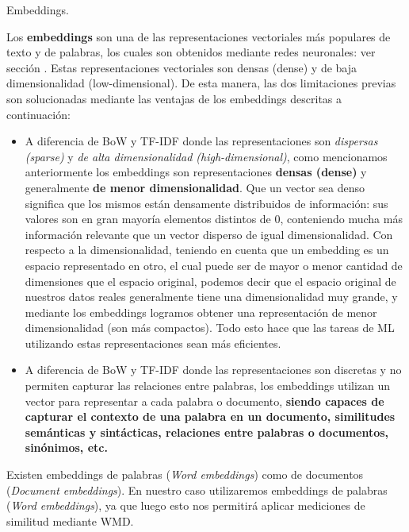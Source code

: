 \documentclass[12pt,a4paper]{article}
\makeatletter
\renewcommand\paragraph{\@startsection{paragraph}{4}{\z@}
            {-2.5ex\@plus -1ex \@minus -.25ex}
            {1.25ex \@plus .25ex}
            {\normalfont\normalsize\bfseries}}
\makeatother
\begin{document}
\begin{sloppypar}
\paragraph{Embeddings.}\label{embedd}

Los \textbf{embeddings} son una de las representaciones vectoriales más populares de texto y de palabras, los cuales son obtenidos mediante redes neuronales: ver sección \textit{}. Estas representaciones vectoriales son densas (dense) y de baja dimensionalidad (low-dimensional)\cite{NLP_26}. De esta manera, las dos limitaciones previas son solucionadas mediante las ventajas de los embeddings descritas a continuación:
\begin{itemize}
\item A diferencia de BoW y TF-IDF donde las representaciones son \textit{dispersas (sparse)} y \textit{de alta dimensionalidad (high-dimensional)}, como mencionamos anteriormente los embeddings son representaciones \textbf{densas (dense)} y generalmente \textbf{de menor dimensionalidad}. Que un vector sea denso significa que los mismos están densamente distribuidos de información: sus valores son en gran mayoría elementos distintos de 0, conteniendo mucha más información relevante que un vector disperso de igual dimensionalidad\cite{NLP_9}. Con respecto a la dimensionalidad, teniendo en cuenta que un embedding es un espacio representado en otro, el cual puede ser de mayor o menor cantidad de dimensiones que el espacio original, podemos decir que el espacio original de nuestros datos reales generalmente tiene una dimensionalidad muy grande, y mediante los embeddings  logramos obtener una representación de menor dimensionalidad (son más compactos)\cite{apunte_uba}. Todo esto hace que las tareas de ML utilizando estas representaciones sean más eficientes. 
\item A diferencia de BoW y TF-IDF donde las representaciones son discretas y no permiten capturar las relaciones entre palabras, los embeddings utilizan un vector para representar a cada palabra o documento, \textbf{siendo capaces de capturar el contexto de una palabra en un documento, similitudes semánticas y sintácticas, relaciones entre palabras o documentos, sinónimos, etc.} 
\end{itemize}

Existen embeddings de palabras (\textit{Word embeddings}) como de documentos (\textit{Document embeddings})\cite{NLP_10}. En nuestro caso utilizaremos embeddings de palabras (\textit{Word embeddings}), ya que luego esto nos permitirá aplicar mediciones de similitud mediante WMD. 


\end{sloppypar}
\end{document}
